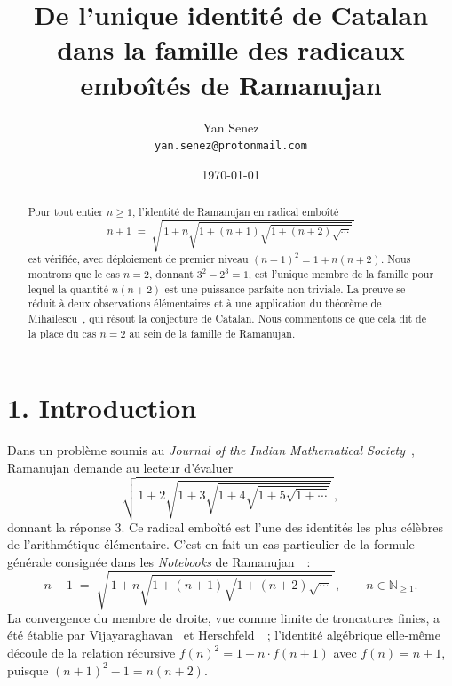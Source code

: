 \documentclass[12pt,a4paper]{article}
\title{\textbf{De l'unique identité de Catalan dans la famille des radicaux emboîtés de Ramanujan}}
\author{Yan Senez\\\texttt{yan.senez@protonmail.com}}
\date{\today}
\begin{document}
\maketitle

\begin{abstract}
Pour tout entier $n \geq 1$, l'identité de Ramanujan en radical emboîté
\[
n + 1 \;=\; \sqrt{\,1 + n\sqrt{1 + (n+1)\sqrt{1 + (n+2)\sqrt{\cdots}}}\,}
\]
est vérifiée, avec déploiement de premier niveau $(n+1)^2 = 1 + n(n+2)$. Nous
montrons que le cas $n = 2$, donnant $3^2 - 2^3 = 1$, est l'unique membre de
la famille pour lequel la quantité $n(n+2)$ est une puissance parfaite non
triviale. La preuve se réduit à deux observations élémentaires et à une
application du théorème de Mihailescu~\cite{Mihailescu2004}, qui résout la
conjecture de Catalan. Nous commentons ce que cela dit de la place du cas
$n = 2$ au sein de la famille de Ramanujan.
\end{abstract}

\section*{1. Introduction}

Dans un problème soumis au \emph{Journal of the Indian Mathematical
Society}~\cite{Ramanujan1911}, Ramanujan demande au lecteur d'évaluer
\begin{equation}
\sqrt{\,1 + 2\sqrt{1 + 3\sqrt{1 + 4\sqrt{1 + 5\sqrt{1 + \cdots}}}}\,},
\label{eq:Rama-3}
\end{equation}
donnant la réponse $3$. Ce radical emboîté est l'une des identités les plus
célèbres de l'arithmétique élémentaire. C'est en fait un cas particulier de
la formule générale consignée dans les \emph{Notebooks} de
Ramanujan~\cite[chap.~12]{Berndt1985}~:
\begin{equation}
n + 1 \;=\; \sqrt{\,1 + n\sqrt{1 + (n+1)\sqrt{1 + (n+2)\sqrt{\cdots}}}\,},
\qquad n \in \mathbb{N}_{\geq 1}.
\label{eq:Rama-general}
\end{equation}
La convergence du membre de droite, vue comme limite de troncatures finies,
a été établie par Vijayaraghavan~\cite{Vijayaraghavan1929} et
Herschfeld~\cite{Herschfeld1935}~; l'identité algébrique elle-même découle de
la relation récursive $f(n)^2 = 1 + n \cdot f(n+1)$ avec $f(n) = n+1$, puisque
$(n+1)^2 - 1 = n(n+2)$.
\end{document}
